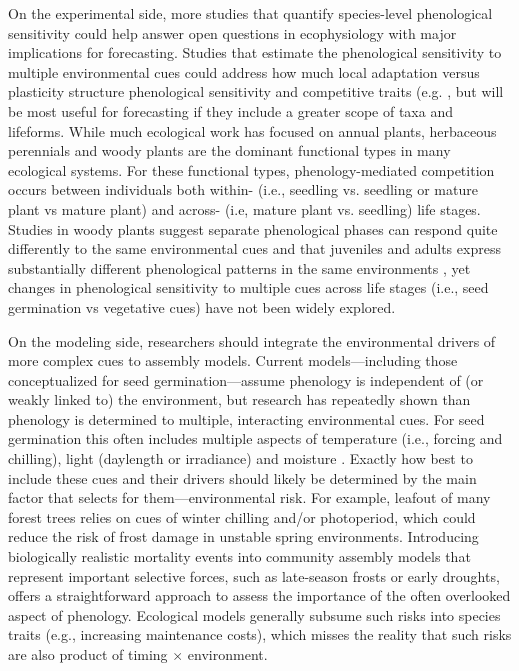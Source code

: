 \documentclass{article}[12pt]
\begin{document}
On the experimental side, more studies that quantify species-level phenological sensitivity could help answer open questions in ecophysiology with major implications for forecasting. Studies that estimate the phenological sensitivity to multiple environmental cues could address how much local adaptation versus plasticity structure phenological sensitivity and competitive traits (e.g. \citep{Lipowsky:2015aa,Liang:2021aa}, but will be most useful for forecasting if they include a greater scope of taxa and lifeforms. While much ecological work has focused on annual plants, herbaceous perennials and woody plants are the dominant functional types in many ecological systems. For these functional types, phenology-mediated competition occurs between individuals both within- (i.e., seedling vs. seedling or mature plant vs mature plant) and across- (i.e, mature plant vs. seedling) life stages. Studies in woody plants suggest separate phenological phases can respond quite differently to the same environmental cues \citep{Buonaiuto:2021aa} and that juveniles and adults express substantially different phenological patterns in the same environments \citep{Vitasse:2013aa}, yet changes in phenological sensitivity to multiple cues across life stages (i.e., seed germination vs vegetative cues) have not been widely explored. 

On the modeling side, researchers should integrate the environmental drivers of more complex cues to assembly models. Current models---including those conceptualized for seed germination---assume phenology is independent of (or weakly linked to) the environment, but research has repeatedly shown than phenology is determined to multiple, interacting environmental cues. For seed germination this often includes multiple aspects of temperature (i.e., forcing and chilling), light (daylength or irradiance) and moisture \citep{Baskin2014,Forrest2010}. Exactly how best to include these cues and their drivers should likely be determined by the main factor that selects for them---environmental risk. For example, leafout of many forest trees relies on cues of winter chilling and/or photoperiod, which could reduce the risk of frost damage in unstable spring environments.  Introducing biologically realistic mortality events into community assembly models that represent important selective forces, such as late-season frosts or early droughts, offers a straightforward approach to assess the importance of the often overlooked aspect of phenology. Ecological models generally subsume such risks into species traits (e.g., increasing maintenance costs), which misses the reality that such risks are also product of timing $\times$ environment. 
\end{document}
